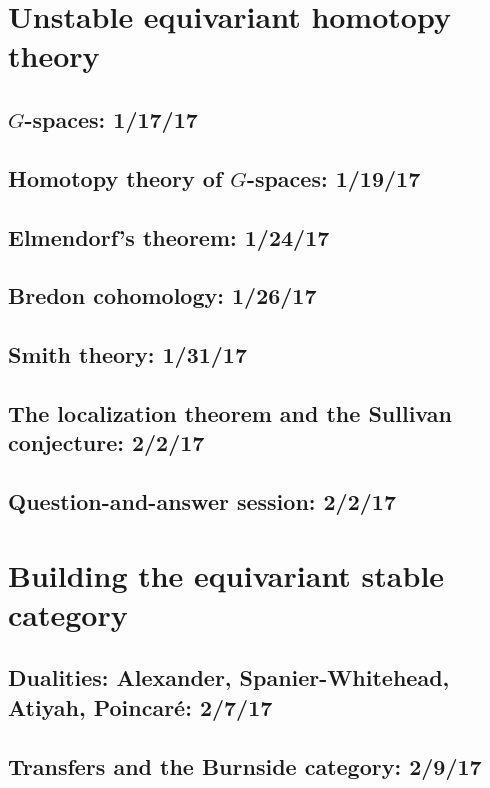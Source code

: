 \documentclass[openany]{style_EHT}
\begin{document}
\frontmatter

\frontstuff %

\mainmatter

\chapter{Unstable equivariant homotopy theory}
\section{$G$-spaces: 1/17/17}
	
\section{Homotopy theory of $G$-spaces: 1/19/17}
	
\section{Elmendorf's theorem: 1/24/17}
	
\section{Bredon cohomology: 1/26/17}
	
\section{Smith theory: 1/31/17}
	
\section{The localization theorem and the Sullivan conjecture: 2/2/17}
	
\section{Question-and-answer session: 2/2/17}
	

\chapter{Building the equivariant stable category}
\section{Dualities: Alexander, Spanier-Whitehead, Atiyah, Poincaré: 2/7/17}
	
\section{Transfers and the Burnside category: 2/9/17}
	
\end{document}
